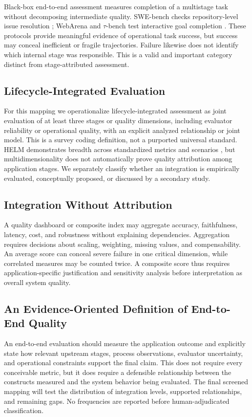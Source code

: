 Black-box end-to-end assessment measures completion of a multistage task without decomposing intermediate quality. SWE-bench checks repository-level issue resolution \cite{jimenez2024swebench}; WebArena and $\tau$-bench test interactive goal completion \cite{zhou2024webarena,yao2025taubench}. These protocols provide meaningful evidence of operational task success, but success may conceal inefficient or fragile trajectories. Failure likewise does not identify which internal stage was responsible. This is a valid and important category distinct from stage-attributed assessment.

\subsection{Lifecycle-Integrated Evaluation}

For this mapping we operationalize lifecycle-integrated assessment as joint evaluation of at least three stages or quality dimensions, including evaluator reliability or operational quality, with an explicit analyzed relationship or joint model. This is a survey coding definition, not a purported universal standard. HELM demonstrates breadth across standardized metrics and scenarios \cite{liang2023helm}, but multidimensionality does not automatically prove quality attribution among application stages. We separately classify whether an integration is empirically evaluated, conceptually proposed, or discussed by a secondary study.

\subsection{Integration Without Attribution}

A quality dashboard or composite index may aggregate accuracy, faithfulness, latency, cost, and robustness without explaining dependencies. Aggregation requires decisions about scaling, weighting, missing values, and compensability. An average score can conceal severe failure in one critical dimension, while correlated measures may be counted twice. A composite score thus requires application-specific justification and sensitivity analysis before interpretation as overall system quality.

\subsection{An Evidence-Oriented Definition of End-to-End Quality}

An end-to-end evaluation should measure the application outcome and explicitly state how relevant upstream stages, process observations, evaluator uncertainty, and operational constraints support the final claim. This does not require every conceivable metric, but it does require a defensible relationship between the constructs measured and the system behavior being evaluated. The final screened mapping will test the distribution of integration levels, supported relationships, and remaining gaps. No frequencies are reported before human-adjudicated classification.
